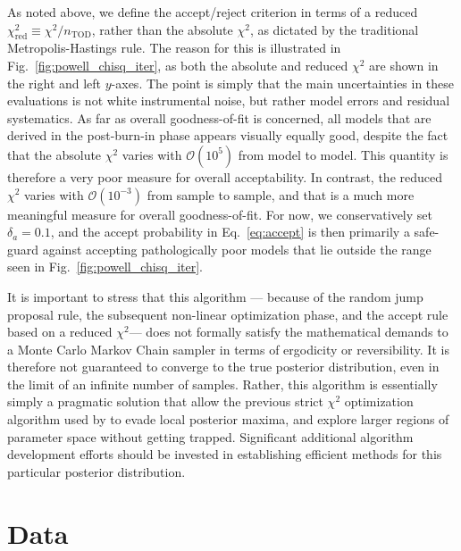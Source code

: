 \documentclass[twocolumn]{aa}
\begin{document}
As noted above, we define the accept/reject criterion in terms of a
reduced $\chi^2_{\mathrm{red}}\equiv\chi^2/n_{\mathrm{TOD}}$, rather
than the absolute $\chi^2$, as dictated by the traditional
Metropolis-Hastings rule. The reason for this is illustrated in
Fig.~\ref{fig:powell_chisq_iter}, as both the absolute and reduced
$\chi^2$ are shown in the right and left $y$-axes. The point is simply
that the main uncertainties in these evaluations is not white
instrumental noise, but rather model errors and residual
systematics. As far as overall goodness-of-fit is concerned, all
models that are derived in the post-burn-in phase appears visually
equally good, despite the fact that the absolute $\chi^2$ varies with
$\mathcal{O}(10^5)$ from model to model. This quantity is therefore a
very poor measure for overall acceptability. In contrast, the reduced
$\chi^2$ varies with $\mathcal{O}(10^{-3})$ from sample to sample, and
that is a much more meaningful measure for overall
goodness-of-fit. For now, we conservatively set $\delta_a = 0.1$, and
the accept probability in Eq.~\eqref{eq:accept} is then primarily a
safe-guard against accepting pathologically poor models that lie
outside the range seen in Fig.~\ref{fig:powell_chisq_iter}. 

It is important to stress that this algorithm --- because of the
random jump proposal rule, the subsequent non-linear optimization
phase, and the accept rule based on a reduced $\chi^2$--- does not
formally satisfy the mathematical demands to a Monte Carlo Markov
Chain sampler in terms of ergodicity or reversibility. It is therefore
not guaranteed to converge to the true posterior distribution, even in
the limit of an infinite number of samples. Rather, this algorithm is
essentially simply a pragmatic solution that allow the previous strict
$\chi^2$ optimization algorithm used by \citet{Kelsall1998} to evade
local posterior maxima, and explore larger regions of parameter space
without getting trapped. Significant additional algorithm development
efforts should be invested in establishing efficient methods for this
particular posterior distribution.

\section{Data}\label{sect:data}
\end{document}
